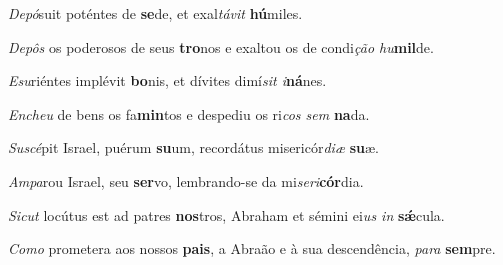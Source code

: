 \begin{greenumerate}
  \switchcolumn*


  \item \textit{Depó}suit poténtes de \textbf{se}de, {\GreStar} et exal\textit{távit} \textbf{hú}\-miles. 

  \switchcolumn%

  \item \textit{Depôs} os poderosos de seus \textbf{tro}nos {\GreStar} e exaltou os de condi\textit{ção hu}\textbf{mil}de. 

  \switchcolumn*


  \item \textit{Esu}riéntes implévit \textbf{bo}nis, {\GreStar} et dívites dimí\textit{sit i}\textbf{ná}nes. 

  \switchcolumn%

  \item \textit{Encheu} de bens os fa\textbf{min}tos {\GreStar} e despediu os ri\textit{cos sem} \textbf{na}da. 

  \switchcolumn*


  \item \textit{Suscé}pit Israel, puérum \textbf{su}um, {\GreStar} recordátus misericór\textit{diæ} \textbf{su}æ. 

  \switchcolumn%

  \item \textit{Ampa}rou Israel, seu \textbf{ser}vo, {\GreStar} lembrando-se da mi\textit{seri}\-\textbf{cór}dia. 

  \switchcolumn*


  \item \textit{Sicut} locútus est ad patres \textbf{nos}tros, {\GreStar} Abraham et sémini ei\textit{us in} \textbf{s{\'\ae}}cula. 

  \switchcolumn%

  \item \textit{Como} prometera aos nossos \textbf{pais}, {\GreStar} a Abraão e à sua descendência, \textit{para} \textbf{sem}pre. 
\end{greenumerate}